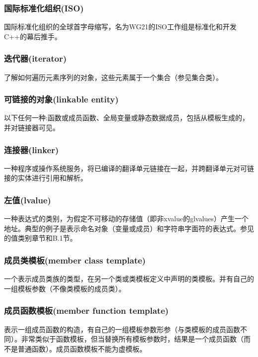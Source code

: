 \subsubsection{国际标准化组织(ISO)}

国际标准化组织的全球首字母缩写，名为WG21的ISO工作组是标准化和开发C++的幕后推手。

\subsubsection{迭代器(iterator)}

了解如何遍历元素序列的对象，这些元素属于一个集合（参见集合类）。

\subsubsection{可链接的对象(linkable entity)}

以下任何一种:函数或成员函数、全局变量或静态数据成员，包括从模板生成的，并对链接器可见。

\subsubsection{连接器(linker)}

一种程序或操作系统服务，将已编译的翻译单元链接在一起，并跨翻译单元对可链接的实体进行引用和解析。

\subsubsection{左值(lvalue)}

一种表达式的类别，为假定不可移动的存储值（即非xvalue的glvalues）产生一个地址。典型的例子是表示命名对象（变量或成员）和字符串字面符的表达式。参见的值类别章节和B.1节。

\subsubsection{成员类模板(member class template)}

一个表示成员类族的类型，在另一个类或类模板定义中声明的类模板。并有自己的一组模板参数（不像类模板的成员类）。

\subsubsection{成员函数模板(member function template)}

表示一组成员函数的构造，有自己的一组模板参数形参（与类模板的成员函数不同）。非常类似于函数模板，但当替换所有模板参数时，结果是一个成员函数（而不是普通函数）。成员函数模板不能为虚模板。

